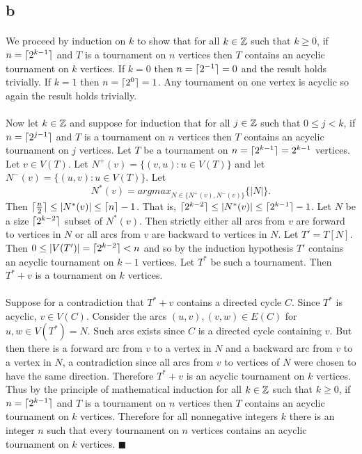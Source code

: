 \documentclass[letterpaper,12pt,oneside,onecolumn]{article}
\DeclarePairedDelimiter{\ceil}{\lceil}{\rceil}
\begin{document}
\subsection*{b}
\paragraph{}
We proceed by induction on $k$ to show that for all $k\in \mathbb{Z}$ such that $k\geq 0$, if $n = \ceil{2^{k-1}}$ and $T$ is a tournament on $n$ vertices then $T$ contains an acyclic tournament on $k$ vertices. If $k=0$ then $n = \ceil{2^{-1}} = 0$ and the result holds trivially. If $k=1$ then $n = \ceil{2^0} =1$. Any tournament on one vertex is acyclic so again the result holds trivially. 
\paragraph{}
Now let $k \in \mathbb{Z}$ and suppose for induction that for all $j \in \mathbb{Z}$ such that $0 \leq j < k$, if $n = \ceil{2^{j-1}}$ and $T$ is a tournament on $n$ vertices then $T$ contains an acyclic tournament on $j$ vertices. Let $T$ be a tournament on $n=\ceil{2^{k-1}} = 2^{k-1}$ vertices. Let $v \in V(T)$. Let $N^+(v) = \{(v,u):u \in V(T)\}$ and let $N^-(v) = \{(u,v): u\in V(T)\}$. Let $$N^*(v) = argmax_{N \in \{N^+(v), N^-(v)\}}\{|N|\}.$$
Then $\ceil{\frac{n}{2}} \leq |N^*(v)| \leq \ceil{n}-1$. That is, $\ceil{2^{k-2}} \leq |N^*(v)| \leq \ceil{2^{k-1}} - 1$. Let $N$ be a size $\ceil{2^{k-2}}$ subset of $N^*(v)$. Then strictly either all arcs from $v$ are forward to vertices in $N$ or all arcs from $v$ are backward to vertices in $N$. Let $T' = T[N]$. Then $0\leq |V(T')| = \ceil{2^{k-2}} < n$ and so by the induction hypothesis $T'$ contains an acyclic tournament on $k-1$ vertices. Let $T^*$ be such a tournament. Then $T^* + v$ is a tournament on $k$ vertices.
\paragraph{}
Suppose for a contradiction that $T^* + v$ contains a directed cycle $C$. Since $T^*$ is acyclic, $v \in V(C)$. Consider the arcs $(u,v), (v,w) \in E(C)$ for $u,w \in V(T^*) = N$. Such arcs exists since $C$ is a directed cycle containing $v$. But then there is a forward arc from $v$ to a vertex in $N$ and a backward arc from $v$ to a vertex in $N$, a contradiction since all arcs from $v$ to vertices of $N$ were chosen to have the same direction. Therefore $T^* + v$ is an acyclic tournament on $k$ vertices. Thus by the principle of mathematical induction for all $k\in \mathbb{Z}$ such that $k\geq 0$, if $n = \ceil{2^{k-1}}$ and $T$ is a tournament on $n$ vertices then $T$ contains an acyclic tournament on $k$ vertices. Therefore for all nonnegative integers $k$ there is an integer $n$ such that every tournament on $n$ vertices contains an acyclic tournament on $k$ vertices. $\blacksquare$
\end{document}
